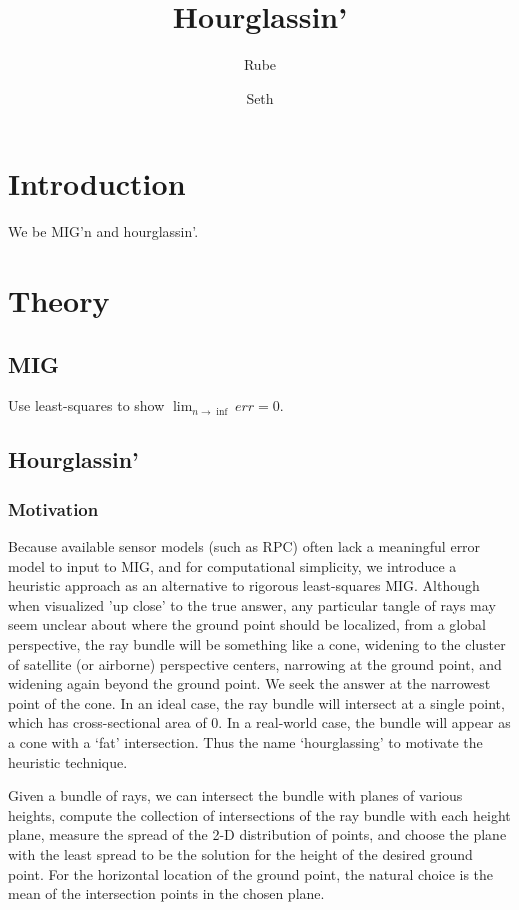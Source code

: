 \documentclass{article}
\begin{document}
\title{Hourglassin'}
\author{Rube}
\author{Seth}

\section{Introduction}
We be MIG'n and hourglassin'.

\section{Theory}
\subsection{MIG}\label{MIG}
Use least-squares to show
$\lim_{n\rightarrow\inf}err=0$.

\subsection{Hourglassin'}
\subsubsection{Motivation}
Because available sensor models (such as RPC) often lack a meaningful
error model to input to MIG, and for computational simplicity, we
introduce a heuristic approach as an alternative to rigorous
least-squares MIG. Although when visualized 'up close' to the true
answer, any particular tangle of rays may seem unclear about where the
ground point should be localized, from a global perspective, the ray
bundle will be something like a cone, widening to the cluster of
satellite (or airborne) perspective centers, narrowing at the ground
point, and widening again beyond the ground point. We seek the answer
at the narrowest point of the cone. In an ideal case, the ray bundle
will intersect at a single point, which has cross-sectional area of
0. In a real-world case, the bundle will appear as a cone with a `fat'
intersection. Thus the name `hourglassing' to motivate the heuristic
technique.

Given a bundle of rays, we can intersect the bundle with planes of
various heights, compute the collection of intersections of the ray
bundle with each height plane, measure the spread of the 2-D
distribution of points, and choose the plane with the least spread to
be the solution for the height of the desired ground point. For the
horizontal location of the ground point, the natural choice is the
mean of the intersection points in the chosen plane.
\end{document}
